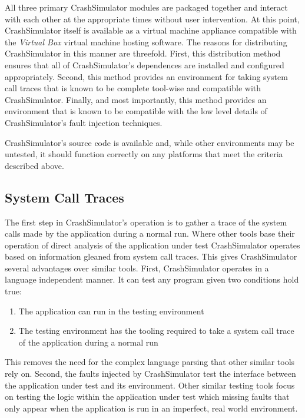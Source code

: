         All three primary CrashSimulator modules are packaged together and interact with each other at the appropriate
        times without user intervention. At this point, CrashSimulator itself is available as a virtual machine
        appliance compatible with the \emph{Virtual Box} virtual machine hosting software. The reasons for distributing
        CrashSimulator in this manner are threefold. First, this distribution method ensures that all of
        CrashSimulator's dependences are installed and configured appropriately. Second, this method provides an
        environment for taking system call traces that is known to be complete tool-wise and compatible with
        CrashSimulator. Finally, and most importantly, this method provides an environment that is known to be
        compatible with the low level details of CrashSimulator's fault injection techniques.

        CrashSimulator's source code is available and, while other environments may be untested, it should function
        correctly on any platforms that meet the criteria described above.

    \subsection{System Call Traces}

        The first step in CrashSimulator's operation is to gather a trace of the system calls made by the application
        during a normal run. Where other tools base their operation of direct analysis of the application under test
        CrashSimulator operates based on information gleaned from system call traces. This gives CrashSimulator several
        advantages over similar tools. First, CrashSimulator operates in a language independent manner. It can test any
        program given two conditions hold true:

        \begin{enumerate}
            \item{The application can run in the testing environment}
            \item{The testing environment has the tooling required to take a system call trace of the application during
            a normal run}
        \end{enumerate}

        This removes the need for the complex language parsing that other similar tools rely on. Second, the faults
        injected by CrashSimulator test the interface between the application under test and its environment. Other
        similar testing tools focus on testing the logic within the application under test which missing faults that
        only appear when the application is run in an imperfect, real world environment.

